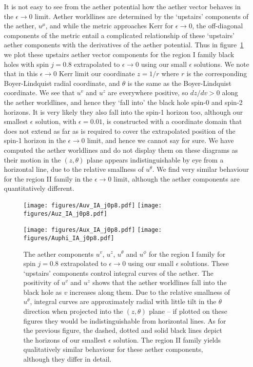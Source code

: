 \documentclass[12pt]{article}
\numberwithin{equation}{section}
\begin{document}
It is not easy to see from the aether potential how the aether vector behaves in the $\epsilon \to 0$ limit. Aether worldlines are determined by the `upstairs' components of the aether, $u^\mu$, and while the metric approaches Kerr for $\epsilon \to 0$, 
the off-diagonal components of the metric 
entail a complicated relationship of
these `upstairs' aether components 
with the derivatives of the aether potential. 
Thus in figure~\ref{fig:aethervector2} we plot these upstairs aether vector components for the region I family black holes with spin $j=0.8$ extrapolated to $\epsilon \to 0$ using our small $\epsilon$ solutions. 
We note that in this $\epsilon \to 0$ Kerr limit our coordinate $z = 1/r$ where $r$ is the corresponding Boyer-Lindquist radial coordinate, and $\theta$ is the same as the Boyer-Lindquist  coordinate.
We see that $u^v$ and $u^z$ are everywhere positive, so $dz/dv>0$ along the aether worldlines, and hence they `fall into' the black hole spin-0 and spin-2 horizons.
It is very likely they also fall into the spin-1 horizon too, although our smallest $\epsilon$ solution, with $\epsilon = 0.01$, is constructed with a coordinate domain that does not extend as far as is required to cover the extrapolated position of the spin-1 horizon in the $\epsilon \to 0$ limit, and hence we cannot say for sure.  We have computed the aether worldlines and do not display them on these diagrams as their motion in the $(z,\theta)$ plane appears indistinguishable by eye from a horizontal line, due to the relative smallness of $u^\theta$. 
We find very similar behaviour for the region II family in the $\epsilon \to 0$ limit, although the aether components are quantitatively different.


\begin{figure}
\centerline{  
  \texttt{[image: figures/Auv\_IA\_j0p8.pdf]}
  \texttt{[image: figures/Auz\_IA\_j0p8.pdf]}
  }
  \centerline{  
  \texttt{[image: figures/Aux\_IA\_j0p8.pdf]}
  \texttt{[image: figures/Auphi\_IA\_j0p8.pdf]}
  }
  \caption{\label{fig:aethervector2}
  The aether components $u^v$, $u^z$, $u^\theta$ and $u^\phi$ for the region I family for spin $j=0.8$ extrapolated to $\epsilon \to 0$ using our small $\epsilon$ solutions. These `upstairs' components control integral curves of the aether. 
   The positivity of $u^v$ and $u^z$ shows that the aether worldlines fall into the black hole as $v$ increases along them.
  Due to the relative smallness of $u^\theta$, integral curves are approximately radial with little tilt in the $\theta$ direction when projected into the $(z,\theta)$ plane -- if plotted on these figures they would be indistinguishable from horizontal lines. As for the previous figure, the dashed, dotted and solid black lines depict the horizons of our smallest $\epsilon$ solution. The region II family yields qualitatively similar behaviour for these aether components, although they differ in detail.
  }
\end{figure}
\end{document}
